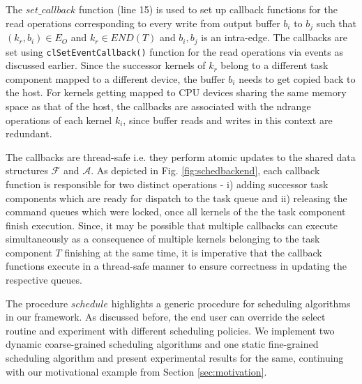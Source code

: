 	\par The $set\_callback$ function (line 15) is used to set up callback functions  for the read operations corresponding to every write from output buffer $b_i$ to $b_j$ such that $(k_r,b_i) \in E_O$ and $k_r \in END(T)$ and $b_i,b_j$ is an intra-edge. The callbacks are set using {\tt clSetEventCallback()} function for the read operations via events as discussed earlier. Since the successor kernels of $k_r$ belong to a different task component mapped to a different device, the buffer $b_i$ needs to get copied back to the host. For kernels getting mapped to CPU devices sharing the same memory space as that of the host, the callbacks are associated with the ndrange operations of each kernel $k_i$, since buffer reads and writes in this context are redundant.
    \par The callbacks are thread-safe i.e. they perform atomic updates to the shared data structures $\mathcal{F}$ and $\mathcal{A}$. As depicted in Fig. \ref{fig:schedbackend}, each callback function is responsible for two distinct operations - i) adding successor task components which are ready for dispatch to the task queue and ii) releasing the command queues which were locked, once all kernels of the the task component finish execution. Since, it may be possible that multiple callbacks can execute simultaneously as a consequence of multiple kernels belonging to the task component $T$ finishing at the same time, it is imperative that the callback functions execute in a thread-safe manner to ensure correctness in updating the respective queues. 
    
    \par The procedure $schedule$ highlights a generic procedure for scheduling algorithms in our framework. As discussed before, the end user can override the select routine and experiment with different scheduling policies. We implement two dynamic coarse-grained scheduling algorithms and one static fine-grained scheduling algorithm and present experimental results for the same, continuing with our  motivational example from Section \ref{sec:motivation}.





    